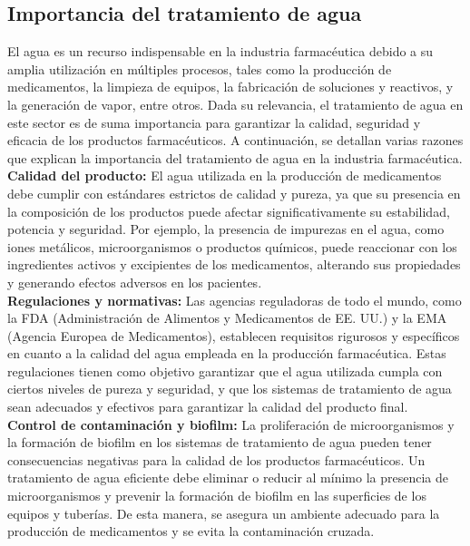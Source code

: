 \subsection{ Importancia del tratamiento de agua}
El agua es un recurso indispensable en la industria farmacéutica debido a su amplia utilización en múltiples procesos, tales como la producción de medicamentos, la limpieza de equipos, la fabricación de soluciones y reactivos, y la generación de vapor, entre otros. Dada su relevancia, el tratamiento de agua en este sector es de suma importancia para garantizar la calidad, seguridad y eficacia de los productos farmacéuticos. A continuación, se detallan varias razones que explican la importancia del tratamiento de agua en la industria farmacéutica.\\

\textbf{Calidad del producto:} El agua utilizada en la producción de medicamentos debe cumplir con estándares estrictos de calidad y pureza, ya que su presencia en la composición de los productos puede afectar significativamente su estabilidad, potencia y seguridad. Por ejemplo, la presencia de impurezas en el agua, como iones metálicos, microorganismos o productos químicos, puede reaccionar con los ingredientes activos y excipientes de los medicamentos, alterando sus propiedades y generando efectos adversos en los pacientes.\\

\textbf{Regulaciones y normativas:} Las agencias reguladoras de todo el mundo, como la FDA (Administración de Alimentos y Medicamentos de EE. UU.) y la EMA (Agencia Europea de Medicamentos), establecen requisitos rigurosos y específicos en cuanto a la calidad del agua empleada en la producción farmacéutica. Estas regulaciones tienen como objetivo garantizar que el agua utilizada cumpla con ciertos niveles de pureza y seguridad, y que los sistemas de tratamiento de agua sean adecuados y efectivos para garantizar la calidad del producto final.\\

\textbf{Control de contaminación y biofilm:} La proliferación de microorganismos y la formación de biofilm en los sistemas de tratamiento de agua pueden tener consecuencias negativas para la calidad de los productos farmacéuticos. Un tratamiento de agua eficiente debe eliminar o reducir al mínimo la presencia de microorganismos y prevenir la formación de biofilm en las superficies de los equipos y tuberías. De esta manera, se asegura un ambiente adecuado para la producción de medicamentos y se evita la contaminación cruzada.\\

